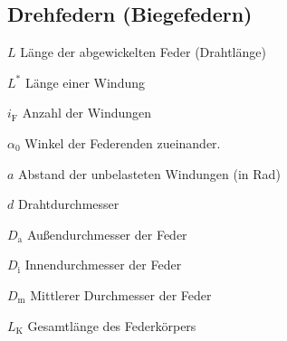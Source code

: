 \subsection{Drehfedern (Biegefedern)}
\begin{vardef}
	\item[$L$] Länge der abgewickelten Feder (Drahtlänge)
	\item[$L^*$] Länge einer Windung
	\item[$i_\text{F}$] Anzahl der Windungen
	\item[$\alpha_0$] Winkel der Federenden zueinander.
	\item[$a$] Abstand der unbelasteten Windungen (in Rad)
	\item[$d$] Drahtdurchmesser
	\item[$D_\text{a}$] Außendurchmesser der Feder
	\item[$D_\text{i}$] Innendurchmesser der Feder
	\item[$D_\text{m}$] Mittlerer  Durchmesser der Feder
	\item[$L_\text{K}$] Gesamtlänge des Federkörpers
\end{vardef}
